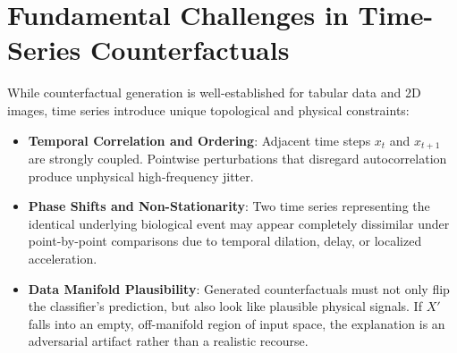 \documentclass[11pt,a4paper]{report}
\begin{document}
\section{Fundamental Challenges in Time-Series Counterfactuals}
While counterfactual generation is well-established for tabular data and 2D images, time series introduce unique topological and physical constraints:
\begin{itemize}
    \item \textbf{Temporal Correlation and Ordering}: Adjacent time steps $x_t$ and $x_{t+1}$ are strongly coupled. Pointwise perturbations that disregard autocorrelation produce unphysical high-frequency jitter.
    \item \textbf{Phase Shifts and Non-Stationarity}: Two time series representing the identical underlying biological event may appear completely dissimilar under point-by-point comparisons due to temporal dilation, delay, or localized acceleration.
    \item \textbf{Data Manifold Plausibility}: Generated counterfactuals must not only flip the classifier's prediction, but also look like plausible physical signals. If $X'$ falls into an empty, off-manifold region of input space, the explanation is an adversarial artifact rather than a realistic recourse.
\end{itemize}
\end{document}
